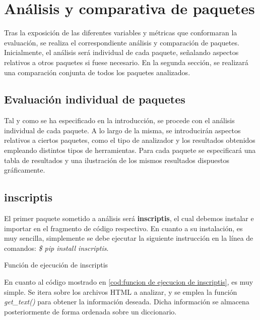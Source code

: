 \chapter{Análisis y comparativa de paquetes}
\label{cha:analisis y comparativa de paquetes}

Tras la exposición de las diferentes variables y métricas que conformaran la evaluación, se realiza el
correspondiente análisis y comparación de paquetes. Inicialmente, el análisis será individual de cada
paquete, señalando aspectos relativos a otros paquetes si fuese necesario. En la segunda sección, se 
realizará una comparación conjunta de todos los paquetes analizados.

\section{Evaluación individual de paquetes}
\label{sec:evaluacion individual de paquetes}

Tal y como se ha especificado en la introducción, se procede con el análisis individual de cada paquete.
A lo largo de la misma, se introducirán aspectos relativos a ciertos paquetes, como el tipo de analizador
y los resultados obtenidos empleando distintos tipos de herramientas. Para cada paquete se especificará 
una tabla de resultados y una ilustración de los mismos resultados dispuestos gráficamente.

\section*{inscriptis}

El primer paquete sometido a análisis será \textbf{inscriptis}, el cual debemos instalar e importar en el
fragmento de código respectivo. En cuanto a su instalación, es muy sencilla, simplemente se debe ejecutar
la siguiente instrucción en la línea de comandos: \emph{\$ pip install inscriptis}.

\begin{codefloat}
    
    \caption{Función de ejecución de inscriptis}
    \label{cod:funcion de ejecucion de inscriptis}
\end{codefloat}

En cuanto al código mostrado en \ref{cod:funcion de ejecucion de inscriptis}, es muy simple. Se itera sobre 
los archivos HTML a analizar, y se emplea la función \emph{get\_text()} para obtener la información deseada. 
Dicha información se almacena posteriormente de forma ordenada sobre un diccionario.

